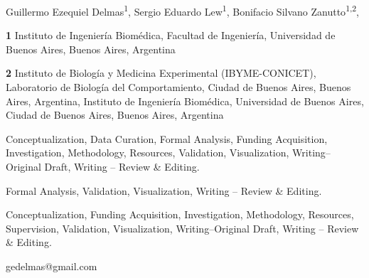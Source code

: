 \documentclass[10pt,letterpaper]{article}
\date{}
\begin{document}
\vspace*{0.2in}

\begin{flushleft}
{\Large
\textbf{} %
}
\newline

Guillermo Ezequiel Delmas\textsuperscript{1\Yinyang},
Sergio Eduardo Lew\textsuperscript{1\ddag},
Bonifacio Silvano Zanutto\textsuperscript{1,2\textcurrency},


\bigskip
\textbf{1} Instituto de Ingeniería Biomédica, Facultad de Ingeniería, Universidad de Buenos Aires, Buenos Aires, Argentina

\textbf{2}  Instituto de Biología y Medicina Experimental (IBYME-CONICET), Laboratorio de Biología del Comportamiento, Ciudad de Buenos Aires, Buenos Aires, Argentina, Instituto de Ingeniería Biomédica, Universidad de Buenos Aires, Ciudad de Buenos Aires, Buenos Aires, Argentina 

\bigskip

% 
%
\textsuperscript{\Yinyang}  Conceptualization, Data Curation, Formal Analysis, Funding Acquisition, Investigation, Methodology, Resources, Validation, Visualization, Writing–Original Draft, Writing – Review \& Editing.

\textsuperscript{\ddag}  Formal Analysis, Validation, Visualization, Writing – Review \& Editing.

\textsuperscript{\textcurrency} Conceptualization, Funding Acquisition, Investigation, Methodology, Resources, Supervision, Validation, Visualization, Writing–Original Draft, Writing – Review \& Editing.





\textsuperscript{\Yinyang} gedelmas@gmail.com

\end{flushleft}
\end{document}
